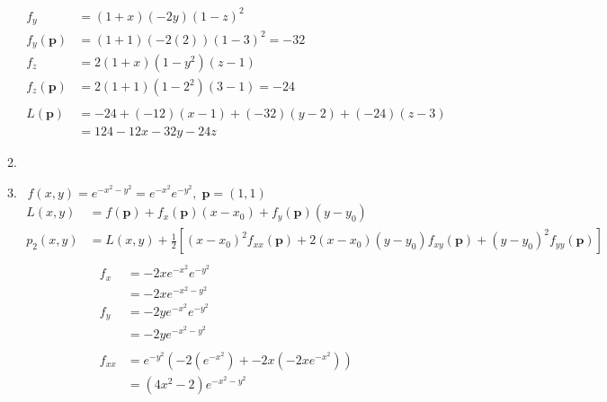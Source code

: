 \documentclass[11pt]{article}
\newcommand\Item[1][]{%
  \ifx\relax#1\relax  \item \else \item[#1] \fi
  \abovedisplayskip=0pt\abovedisplayshortskip=0pt~\vspace*{-\baselineskip}}
\begin{document}
\begin{preview}
\begin{enumerate}
\begin{enumerate}
\begin{align*}
                      f_{y}             & = (1+x)(-2y)(1-z)^2                            \\
                      f_{y}(\textbf{p}) & = (1+1)(-2(2))(1-3)^2=-32                      \\
                      f_{z}             & = 2(1+x)(1-y^2)(z-1)                           \\
                      f_{z}(\textbf{p}) & = 2(1+1)(1-2^2)(3-1)=-24                       \\\\
                      L(\textbf{p})     & = -24 + (-12)(x-1) + (-32)(y-2) + (-24)(z-3)   \\
                                        & = 124 - 12x - 32y - 24z
                  \end{align*}
                  \Item $f(x,y) = e^{-x^2-y^2} = e^{-x^2}e^{-y^2}, \; \textbf{p} = (1,1) $\\
                  \begin{align*}
                      L(x,y)     & =  f(\textbf{p}) + f_x(\textbf{p})(x-x_0)+ f_y(\textbf{p})(y-y_0)                                                                    \\
                      p_{2}(x,y) & = L(x,y) + \frac{1}{2}\left[(x-x_0)^{2}f_{xx}(\textbf{p}) + 2(x-x_0)(y-y_0)f_{xy}(\textbf{p}) + (y-y_0)^{2}f_{yy}(\textbf{p})\right] \\
                  \end{align*}
                  \begin{align*}
                      f_{x}              & = -2xe^{-x^2}e^{-y^2}                                                                                 \\
                                         & = -2xe^{-x^2-y^2}                                                                                     \\
                      f_{y}              & = -2ye^{-x^2}e^{-y^2}                                                                                 \\
                                         & = -2ye^{-x^2-y^2}                                                                                     \\\\
                      f_{xx}             & = e^{-y^2}(-2(e^{-x^2}) + -2x(-2xe^{-x^2}))                                                           \\
                                         & = (4x^2 - 2)e^{-x^2-y^2}                                                                              \\

\end{align*}
\end{enumerate}
\end{enumerate}
\end{preview}
\end{document}
